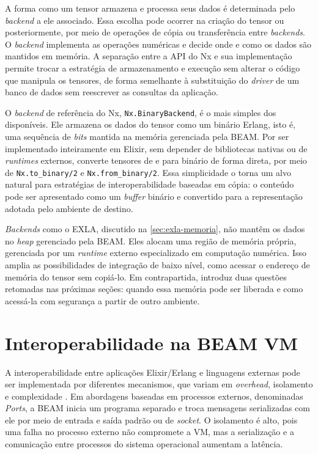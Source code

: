 A forma como um tensor armazena e processa seus dados é determinada pelo \textit{backend} a ele associado. Essa escolha pode ocorrer na criação do tensor ou posteriormente, por meio de operações de cópia ou transferência entre \textit{backends}. O \textit{backend} implementa as operações numéricas e decide onde e como os dados são mantidos em memória. A separação entre a \gls{API} do \gls{Nx} e sua implementação permite trocar a estratégia de armazenamento e execução sem alterar o código que manipula os tensores, de forma semelhante à substituição do \textit{driver} de um banco de dados sem reescrever as consultas da aplicação.

O \textit{backend} de referência do \gls{Nx}, \texttt{Nx.BinaryBackend}, é o mais simples dos disponíveis. Ele armazena os dados do tensor como um binário Erlang, isto é, uma sequência de \textit{bits} mantida na memória gerenciada pela \gls{BEAM}. Por ser implementado inteiramente em Elixir, sem depender de bibliotecas nativas ou de \textit{runtimes} externos, converte tensores de e para binário de forma direta, por meio de \texttt{Nx.to\_binary/2} e \texttt{Nx.from\_binary/2}. Essa simplicidade o torna um alvo natural para estratégias de interoperabilidade baseadas em cópia: o conteúdo pode ser apresentado como um \textit{buffer} binário e convertido para a representação adotada pelo ambiente de destino.

\textit{Backends} como o \gls{EXLA}, discutido na \autoref{sec:exla-memoria}, não mantêm os dados no \textit{heap} gerenciado pela \gls{BEAM}. Eles alocam uma região de memória própria, gerenciada por um \textit{runtime} externo especializado em computação numérica. Isso amplia as possibilidades de integração de baixo nível, como acessar o endereço de memória do tensor sem copiá-lo. Em contrapartida, introduz duas questões retomadas nas próximas seções: quando essa memória pode ser liberada e como acessá-la com segurança a partir de outro ambiente.

\section{Interoperabilidade na BEAM VM}\label{sec:interoperabilidade-beam}

A interoperabilidade entre aplicações Elixir/Erlang e linguagens externas pode ser implementada por diferentes mecanismos, que variam em \textit{overhead}, isolamento e complexidade \citep{erlang2024}. Em abordagens baseadas em processos externos, denominadas \textit{Ports}, a \gls{BEAM} inicia um programa separado e troca mensagens serializadas com ele por meio de entrada e saída padrão ou de \textit{socket}. O isolamento é alto, pois uma falha no processo externo não compromete a \gls{VM}, mas a serialização e a comunicação entre processos do sistema operacional aumentam a latência.

